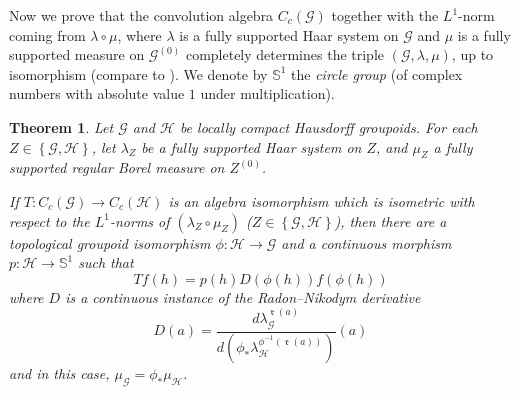 \documentclass[letter,11pt]{amsart}
\theoremstyle{plain}		\newtheorem{theorem}[generalnumbering]{Theorem}
\theoremstyle{plain}		\newtheorem{corollary}[generalnumbering]{Corollary}
\theoremstyle{definition}		\newtheorem{definition}[generalnumbering]{Definition}
\theoremstyle{definition}		\newtheorem{example}[generalnumbering]{Example}
\theoremstyle{plain}		\newtheorem{proposition}[generalnumbering]{Proposition}
\theoremstyle{plain}		\newtheorem{lemma}[generalnumbering]{Lemma}
\theoremstyle{plain}    \newtheorem{plainstyle}[generalnumbering]{\namefordifferentenvironment}
\theoremstyle{plain}    \newtheorem*{plainstyle*}{\namefordifferentenvironment}
\theoremstyle{definition}    \newtheorem{definitionstyle}[generalnumbering]{\namefordifferentenvironment}
\theoremstyle{definition}    \newtheorem*{definitionstyle*}{\namefordifferentenvironment}
\DeclareMathOperator{\ra}{\mathfrak{r}}
\begin{document}
Now we prove that the convolution algebra $C_c(\mathcal{G})$ together with the $L^1$-norm coming from $\lambda\circ\mu$, where $\lambda$ is a fully supported Haar system on $\mathcal{G}$ and $\mu$ is a fully supported measure on $\mathcal{G}^{(0)}$ completely determines the triple $(\mathcal{G},\lambda,\mu)$, up to isomorphism (compare to \cite{MR2102633}). We denote by $\mathbb{S}^1$ the \emph{circle group} (of complex numbers with absolute value $1$ under multiplication).

\begin{theorem}\label{theoremmeasuredgroupoidconvolutionalgebra}
	Let $\mathcal{G}$ and $\mathcal{H}$ be locally compact Hausdorff groupoids. For each $Z\in\left\{\mathcal{G},\mathcal{H}\right\}$, let $\lambda_Z$ be a fully supported Haar system on $Z$, and $\mu_Z$ a fully supported regular Borel measure on $Z^{(0)}$.
	
	If $T\colon C_c(\mathcal{G})\to C_c(\mathcal{H})$ is an algebra isomorphism which is isometric with respect to the $L^1$-norms of $(\lambda_Z\circ \mu_Z)$ ($Z\in\left\{\mathcal{G},\mathcal{H}\right\}$), then there are a topological groupoid isomorphism $\phi:\mathcal{H}\to\mathcal{G}$ and a continuous morphism $p:\mathcal{H}\to\mathbb{S}^1$ such that
	\[Tf(h)=p(h)D(\phi(h))f(\phi(h))\]
	where $D$ is a continuous instance of the Radon--Nikodym derivative
	\[D(a)=\frac{d\lambda_{\mathcal{G}}^{\ra(a)}}{d(\phi_*\lambda_{\mathcal{H}}^{\phi^{-1}(\ra(a))})}(a)\]
	and in this case, $\mu_{\mathcal{G}}=\phi_*\mu_{\mathcal{H}}$.
\end{theorem}
\end{document}
